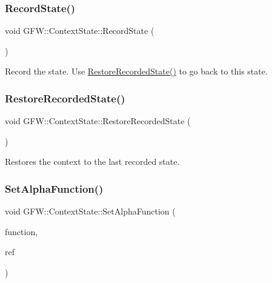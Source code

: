\subsubsection{\texorpdfstring{Record\+State()}{RecordState()}}
{\footnotesize\ttfamily void G\+F\+W\+::\+Context\+State\+::\+Record\+State (\begin{DoxyParamCaption}{ }\end{DoxyParamCaption})}



Record the state. Use \hyperlink{class_g_f_w_1_1_context_state_a3ca74e03440f1e847a6b61a24e3730e8}{Restore\+Recorded\+State()} to go back to this state. 

\mbox{\label{class_g_f_w_1_1_context_state_a3ca74e03440f1e847a6b61a24e3730e8}} 
\subsubsection{\texorpdfstring{Restore\+Recorded\+State()}{RestoreRecordedState()}}
{\footnotesize\ttfamily void G\+F\+W\+::\+Context\+State\+::\+Restore\+Recorded\+State (\begin{DoxyParamCaption}{ }\end{DoxyParamCaption})}



Restores the context to the last recorded state. 

\mbox{\label{class_g_f_w_1_1_context_state_a050bc15d46f42296f22cbcb0eaf07711}} 
\subsubsection{\texorpdfstring{Set\+Alpha\+Function()}{SetAlphaFunction()}}
{\footnotesize\ttfamily void G\+F\+W\+::\+Context\+State\+::\+Set\+Alpha\+Function (\begin{DoxyParamCaption}\item[{\hyperlink{namespace_g_f_w_a2eabb5a646179bceaab2d5e3bfce2316}{Test\+Function}}]{function,  }\item[{float}]{ref }\end{DoxyParamCaption})}



